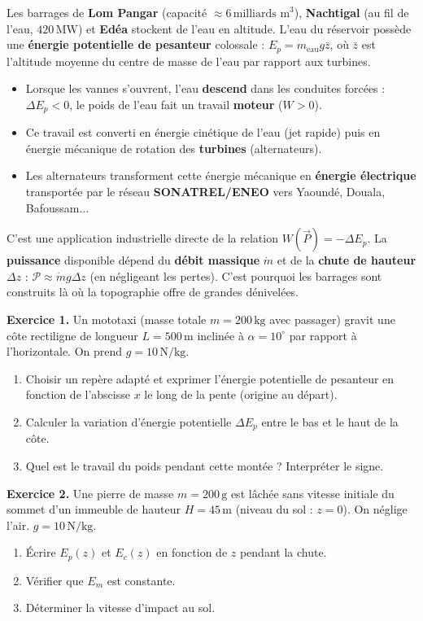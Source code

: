 \documentclass[11pt]{article}
\begin{document}
\begin{savaistu}
Les barrages de \textbf{Lom Pangar} (capacité $\approx 6\,\text{milliards m}^3$), \textbf{Nachtigal} (au fil de l'eau, $420\,\text{MW}$) et \textbf{Edéa} stockent de l'eau en altitude. L'eau du réservoir possède une \textbf{énergie potentielle de pesanteur} colossale : $E_p = m_{\text{eau}} g \bar{z}$, où $\bar{z}$ est l'altitude moyenne du centre de masse de l'eau par rapport aux turbines.
\begin{itemize}
\item Lorsque les vannes s'ouvrent, l'eau \textbf{descend} dans les conduites forcées : $\Delta E_p < 0$, le poids de l'eau fait un travail \textbf{moteur} ($W>0$).
\item Ce travail est converti en énergie cinétique de l'eau (jet rapide) puis en énergie mécanique de rotation des \textbf{turbines} (alternateurs).
\item Les alternateurs transforment cette énergie mécanique en \textbf{énergie électrique} transportée par le réseau \textbf{SONATREL/ENEO} vers Yaoundé, Douala, Bafoussam...
\end{itemize}
C'est une application industrielle directe de la relation $W(\vec{P}) = -\Delta E_p$. La \textbf{puissance} disponible dépend du \textbf{débit massique} $\dot{m}$ et de la \textbf{chute de hauteur} $\Delta z$ : $\mathcal{P} \approx \dot{m} g \Delta z$ (en négligeant les pertes). C'est pourquoi les barrages sont construits là où la topographie offre de grandes dénivelées.
\end{savaistu}

\begin{exercice}
\textbf{Exercice 1.} Un mototaxi (masse totale $m = 200\,\text{kg}$ avec passager) gravit une côte rectiligne de longueur $L = 500\,\text{m}$ inclinée à $\alpha = 10^\circ$ par rapport à l'horizontale. On prend $g = 10\,\text{N/kg}$.
\begin{enumerate}
\item Choisir un repère adapté et exprimer l'énergie potentielle de pesanteur en fonction de l'abscisse $x$ le long de la pente (origine au départ).
\item Calculer la variation d'énergie potentielle $\Delta E_p$ entre le bas et le haut de la côte.
\item Quel est le travail du poids pendant cette montée ? Interpréter le signe.
\end{enumerate}

\textbf{Exercice 2.} Une pierre de masse $m = 200\,\text{g}$ est lâchée sans vitesse initiale du sommet d'un immeuble de hauteur $H = 45\,\text{m}$ (niveau du sol : $z=0$). On néglige l'air. $g=10\,\text{N/kg}$.
\begin{enumerate}
\item Écrire $E_p(z)$ et $E_c(z)$ en fonction de $z$ pendant la chute.
\item Vérifier que $E_m$ est constante.
\item Déterminer la vitesse d'impact au sol.
\end{enumerate}
\end{exercice}
\end{document}

